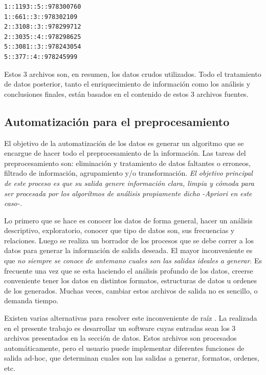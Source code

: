 \documentclass[journal]{IEEEtran}
\begin{document}
\begin{enumerate}
\begin{itemize}
        \begin{lstlisting}[frame=single,breaklines=true]
1::1193::5::978300760
1::661::3::978302109
2::3108::3::978299712
2::3035::4::978298625
5::3081::3::978243054
5::377::4::978245999
        \end{lstlisting}
    \end{itemize}

\end{enumerate}

Estos 3 archivos son, en resumen, los datos crudos utilizados. 
Todo el tratamiento de datos posterior, tanto el enriquecimiento de información como los
análisis y conclusiones finales, están basados en el contenido de estos 3 archivos
fuentes.

\subsection{Automatización para el preprocesamiento}
El objetivo de la automatización de los datos es generar un algoritmo que se encargue
de hacer todo el preprocesamiento de la información. Las tareas del preprocesamiento
son: eliminación  y tratamiento  de datos faltantes o erroneos, filtrado de información,
agrupamiento y/o transformación.
\emph{El objetivo principal de este proceso es que su salida genere información clara, limpia y cómoda
para ser procesada por los algorítmos de análisis propiamente dicho -Apriori en este caso-.}

Lo primero que se hace es conocer los datos de forma general, hacer un análisis descriptivo,
exploratorio, conocer que tipo de datos son, sus frecuencias y relaciones. Luego se realiza un
borrador de los procesos que se debe correr a los datos para generar la información de salida 
deseada. El mayor inconveniente es que \emph{no siempre se conoce de antemano cuales son las
salidas ideales a generar}. Es frecuente una vez que se esta haciendo el análisis profundo
de los datos, creerse conveniente tener los datos en distintos formatos, estructuras de
datos u ordenes de los generados. Muchas veces, cambiar estos archivos de salida no 
es sencillo, o demanda tiempo.

Existen varias alternativas para resolver este inconveniente de raíz
. La realizada en el presente
trabajo es desarrollar un software cuyas entradas sean los 3 archivos presentados en 
la sección de datos. Estos archivos son procesados automáticamente, pero el usuario
puede implementar diferentes funciones de salida ad-hoc, que determinan cuales son
las salidas a generar, formatos, ordenes, etc.
\end{document}
